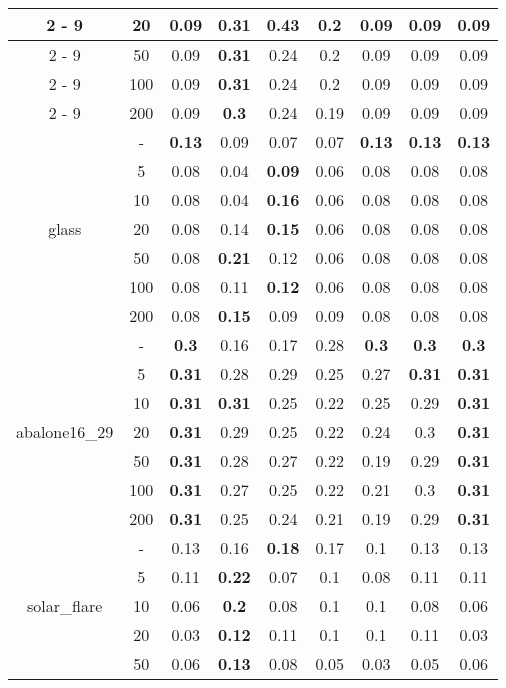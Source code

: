 \documentclass{article}%
\begin{document}
\begin{longtable}{c|c|ccccccc}
\cline{2%
-%
9}%
&20&0.09&0.31&\textbf{0.43}&0.2&0.09&0.09&0.09\\%
\cline{2%
-%
9}%
&50&0.09&\textbf{0.31}&0.24&0.2&0.09&0.09&0.09\\%
\cline{2%
-%
9}%
&100&0.09&\textbf{0.31}&0.24&0.2&0.09&0.09&0.09\\%
\cline{2%
-%
9}%
&200&0.09&\textbf{0.3}&0.24&0.19&0.09&0.09&0.09\\%
\hline%
\multirow{7}{*}{glass}&{-}&\textbf{0.13}&0.09&0.07&0.07&\textbf{0.13}&\textbf{0.13}&\textbf{0.13}\\%
\cline{2%
-%
9}%
&5&0.08&0.04&\textbf{0.09}&0.06&0.08&0.08&0.08\\%
\cline{2%
-%
9}%
&10&0.08&0.04&\textbf{0.16}&0.06&0.08&0.08&0.08\\%
\cline{2%
-%
9}%
&20&0.08&0.14&\textbf{0.15}&0.06&0.08&0.08&0.08\\%
\cline{2%
-%
9}%
&50&0.08&\textbf{0.21}&0.12&0.06&0.08&0.08&0.08\\%
\cline{2%
-%
9}%
&100&0.08&0.11&\textbf{0.12}&0.06&0.08&0.08&0.08\\%
\cline{2%
-%
9}%
&200&0.08&\textbf{0.15}&0.09&0.09&0.08&0.08&0.08\\%
\hline%
\multirow{7}{*}{abalone16\_29}&{-}&\textbf{0.3}&0.16&0.17&0.28&\textbf{0.3}&\textbf{0.3}&\textbf{0.3}\\%
\cline{2%
-%
9}%
&5&\textbf{0.31}&0.28&0.29&0.25&0.27&\textbf{0.31}&\textbf{0.31}\\%
\cline{2%
-%
9}%
&10&\textbf{0.31}&\textbf{0.31}&0.25&0.22&0.25&0.29&\textbf{0.31}\\%
\cline{2%
-%
9}%
&20&\textbf{0.31}&0.29&0.25&0.22&0.24&0.3&\textbf{0.31}\\%
\cline{2%
-%
9}%
&50&\textbf{0.31}&0.28&0.27&0.22&0.19&0.29&\textbf{0.31}\\%
\cline{2%
-%
9}%
&100&\textbf{0.31}&0.27&0.25&0.22&0.21&0.3&\textbf{0.31}\\%
\cline{2%
-%
9}%
&200&\textbf{0.31}&0.25&0.24&0.21&0.19&0.29&\textbf{0.31}\\%
\hline%
\multirow{7}{*}{solar\_flare}&{-}&0.13&0.16&\textbf{0.18}&0.17&0.1&0.13&0.13\\%
\cline{2%
-%
9}%
&5&0.11&\textbf{0.22}&0.07&0.1&0.08&0.11&0.11\\%
\cline{2%
-%
9}%
&10&0.06&\textbf{0.2}&0.08&0.1&0.1&0.08&0.06\\%
\cline{2%
-%
9}%
&20&0.03&\textbf{0.12}&0.11&0.1&0.1&0.11&0.03\\%
\cline{2%
-%
9}%
&50&0.06&\textbf{0.13}&0.08&0.05&0.03&0.05&0.06\\%

\end{longtable}
\end{document}
